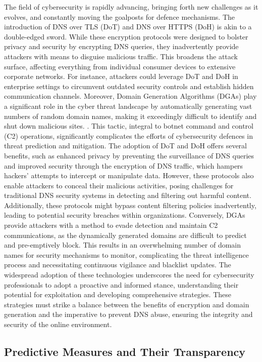 The field of cybersecurity is rapidly advancing, bringing forth new challenges as it evolves, and constantly moving the goalposts for defence mechanisms. The introduction of DNS over TLS (DoT) and DNS over HTTPS (DoH) is akin to a double-edged sword. While these encryption protocols were designed to bolster privacy and security by encrypting DNS queries, they inadvertently provide attackers with means to disguise malicious traffic. This broadens the attack surface, affecting everything from individual consumer devices to extensive corporate networks. For instance, attackers could leverage DoT and DoH in enterprise settings to circumvent outdated security controls and establish hidden communication channels. Moreover, Domain Generation Algorithms (DGAs) play a significant role in the cyber threat landscape by automatically generating vast numbers of random domain names, making it exceedingly difficult to identify and shut down malicious sites. \cite{kaur2023artificial}. This tactic, integral to botnet command and control (C2) operations, significantly complicates the efforts of cybersecurity defences in threat prediction and mitigation.
The adoption of DoT and DoH offers several benefits, such as enhanced privacy by preventing the surveillance of DNS queries and improved security through the encryption of DNS traffic, which hampers hackers' attempts to intercept or manipulate data. However, these protocols also enable attackers to conceal their malicious activities, posing challenges for traditional DNS security systems in detecting and filtering out harmful content. Additionally, these protocols might bypass content filtering policies inadvertently, leading to potential security breaches within organizations.
Conversely, DGAs provide attackers with a method to evade detection and maintain C2 communications, as the dynamically generated domains are difficult to predict and pre-emptively block. This results in an overwhelming number of domain names for security mechanisms to monitor, complicating the threat intelligence process and necessitating continuous vigilance and blacklist updates. The widespread adoption of these technologies underscores the need for cybersecurity professionals to adopt a proactive and informed stance, understanding their potential for exploitation and developing comprehensive strategies. These strategies must strike a balance between the benefits of encryption and domain generation and the imperative to prevent DNS abuse, ensuring the integrity and security of the online environment.


\subsection{Predictive Measures and Their Transparency}

